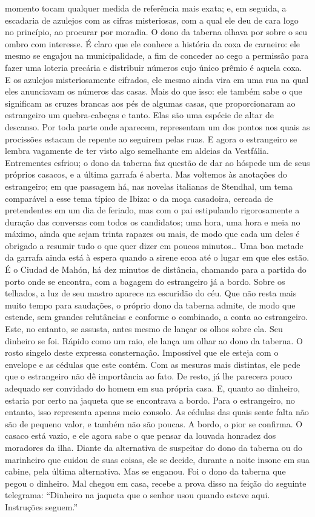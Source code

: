 momento tocam qualquer medida de referência mais exata; e, em seguida, a
escadaria de azulejos com as cifras misteriosas, com a qual ele deu de
cara logo no princípio, ao procurar por moradia. O dono da taberna
olhava por sobre o seu ombro com interesse. É claro que ele conhece a
história da coxa de carneiro: ele mesmo se engajou na municipalidade, a
fim de conceder ao cego a permissão para fazer uma loteria precária e
distribuir números cujo único prêmio é aquela coxa. E os azulejos
misteriosamente cifrados, ele mesmo ainda vira em uma rua na qual eles
anunciavam os números das casas. Mais do que isso: ele também sabe o que
significam as cruzes brancas aos pés de algumas casas, que
proporcionaram ao estrangeiro um quebra-cabeças e tanto. Elas são uma
espécie de altar de descanso. Por toda parte onde aparecem, representam
um dos pontos nos quais as procissões estacam de repente ao seguirem
pelas ruas. E agora o estrangeiro se lembra vagamente de ter visto algo
semelhante em aldeias da Vestfália. Entrementes esfriou; o dono da
taberna faz questão de dar ao hóspede um de seus próprios casacos, e a
última garrafa é aberta. Mas voltemos às anotações do estrangeiro; em
que passagem há, nas novelas italianas de Stendhal, um tema comparável a
esse tema típico de Ibiza: o da moça casadoira, cercada de pretendentes
em um dia de feriado, mas com o pai estipulando rigorosamente a duração
das conversas com todos os candidatos; uma hora, uma hora e meia no
máximo, ainda que sejam trinta rapazes ou mais, de modo que cada um
deles é obrigado a resumir tudo o que quer dizer em poucos minutos\ldots{}
Uma boa metade da garrafa ainda está à espera quando a sirene ecoa até o
lugar em que eles estão. É o Ciudad de Mahón, há dez minutos de
distância, chamando para a partida do porto onde se encontra, com a
bagagem do estrangeiro já a bordo. Sobre os telhados, a luz de seu
mastro aparece na escuridão do céu. Que não resta mais muito tempo para
saudações, o próprio dono da taberna admite, de modo que estende, sem
grandes relutâncias e conforme o combinado, a conta ao estrangeiro.
Este, no entanto, se assusta, antes mesmo de lançar os olhos sobre ela.
Seu dinheiro se foi. Rápido como um raio, ele lança um olhar ao dono da
taberna. O rosto singelo deste expressa consternação. Impossível que ele
esteja com o envelope e as cédulas que este contém. Com as mesuras mais
distintas, ele pede que o estrangeiro não dê importância ao fato. De
resto, já lhe parecera pouco adequado ser convidado do homem em sua
própria casa. E, quanto ao dinheiro, estaria por certo na jaqueta que se
encontrava a bordo. Para o estrangeiro, no entanto, isso representa
apenas meio consolo. As cédulas das quais sente falta não são de pequeno
valor, e também não são poucas. A bordo, o pior se confirma. O casaco
está vazio, e ele agora sabe o que pensar da louvada honradez dos
moradores da ilha. Diante da alternativa de suspeitar do dono da taberna
ou do marinheiro que cuidou de suas coisas, ele se decide, durante a
noite insone em sua cabine, pela última alternativa. Mas se enganou. Foi
o dono da taberna que pegou o dinheiro. Mal chegou em casa, recebe a
prova disso na feição do seguinte telegrama: ``Dinheiro na jaqueta que o
senhor usou quando esteve aqui. Instruções seguem.''

